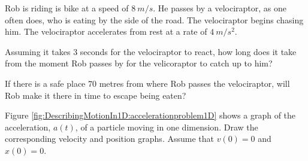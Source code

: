 \begin{problemParts}{Rob is riding is bike at a speed of $\SI{8}{m/s}$. He passes by a velociraptor, as one often does, who is eating by the side of the road. The velociraptor begins chasing him. The velociraptor accelerates from rest at a rate of $\SI{4}{m/s^2}$.\label{prob:Velociraptor}} 
\item Assuming it takes 3 seconds for the velociraptor to react, how long does it take from the moment Rob passes by for the velicoraptor to catch up to him? 
\item If there is a safe place 70 metres from where Rob passes the velociraptor, will Rob make it there in time to escape being eaten?  
\end{problemParts}

\begin{problem} {Figure \ref{fig:DescribingMotionIn1D:accelerationproblem1D} shows a graph of the acceleration, $a(t)$, of a particle moving in one dimension. Draw the corresponding velocity and position graphs. Assume that $v(0)=0$ and $x(0)=0$.\label{prob:accelerationTime}}
\end{problem}

\newpage
